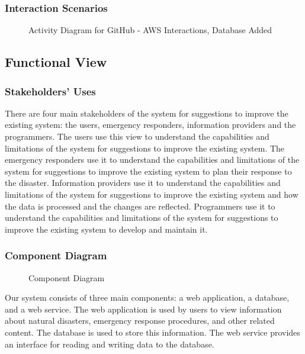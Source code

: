 \documentclass[a4paper]{article}
\begin{document}
    \subsubsection{Interaction Scenarios}
    \begin{figure}
        
        \caption{Activity Diagram for GitHub - AWS Interactions, Database Added}
    \end{figure}
    
    \subsection{Functional View}
    \subsubsection{Stakeholders' Uses}
    There are four main stakeholders of the system for suggestions to improve the existing system: the users, emergency responders,
    information providers and the programmers. The users use this view to understand the capabilities and limitations of the system
    for suggestions to improve the existing system. The emergency responders use it to understand the capabilities and limitations
    of the system for suggestions to improve the existing system to plan their response to the disaster. Information providers use
    it to understand the capabilities and limitations of the system for suggestions to improve the existing system and how the data
    is processed and the changes are reflected. Programmers use it to understand the capabilities and limitations of the system for
    suggestions to improve the existing system to develop and maintain it.

    \subsubsection{Component Diagram}
    \begin{figure}
        
        \caption{Component Diagram}
    \end{figure}

    Our system consists of three main components: a web application, a database, and a web service. The web application is used by
    users to view information about natural disasters, emergency response procedures, and other related content. The database is
    used to store this information. The web service provides an interface for reading and writing data to the database.
\end{document}

